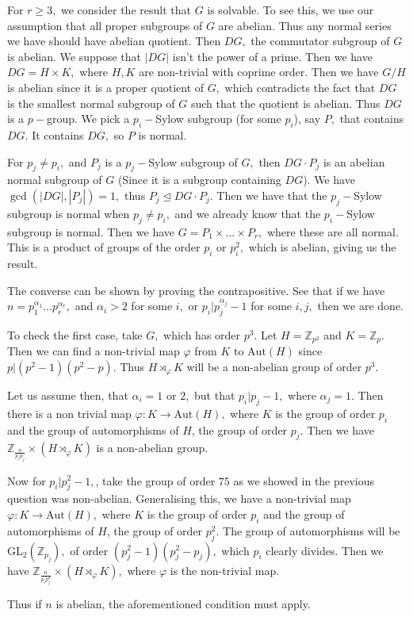 \documentclass{article}
\begin{document}
For $r \geq 3,$ we consider the result that $G$ is solvable. To see this, we use our assumption that all proper subgroups of $G$ are abelian. Thus any 
normal series we have should have abelian quotient. Then $DG,$ the commutator subgroup of $G$ is abelian. We suppose that $|DG|$ isn't the power of a prime. 
Then we have $DG=H \times K,$ where $H,K$ are non-trivial with coprime order. Then we have $G/H$ is abelian since it is a proper quotient of $G,$ which 
contradicts the fact that $DG$ is the smallest normal subgroup of $G$ such that the quotient is abelian. Thus $DG$ is a $p-$group. We pick a $p_i-$Sylow 
subgroup (for some $p_i$), say $P,$ that contains $DG.$ It contains $DG,$ so $P$ is normal. 

For $p_j \neq p_i,$ and $P_j$ is a $p_j-$Sylow subgroup of $G,$ then $DG \cdot P_j$ is an abelian normal subgroup of $G$ (Since it is a subgroup containing 
$DG$). We have $\gcd(|DG|,|P_j|)=1,$ thus $ P_j \trianglelefteq DG \cdot P_j.$ Then we have that the $p_j-$Sylow subgroup is normal when $p_j \neq p_i,$ and 
we already know that the $p_i-$Sylow subgroup is normal. Then we have $G= P_1 \times \dots \times P_r,$ where these are all normal. This is a product of 
groups of the order $p_i$ or $p_i^2,$ which is abelian, giving us the result.

The converse can be shown by proving the contrapositive. See that if we have $n=p_1^{\alpha_1}\dots p_r^{\alpha_r},$ and $\alpha_i>2$ for some $i,$ or $p_i 
| p_j^{\alpha_j}-1$ for some $i,j,$ then we are done. 

To check the first case, take $G,$ which has order $p^3.$ Let $H=\mathbb{Z}_{p^2}$ and $K=\mathbb{Z}_p.$ Then we can find a non-trivial map $\varphi$ from 
$K$ to $\text{Aut}(H)$ since $p| (p^2-1)(p^2-p).$ Thus $H \rtimes_{\varphi} K$ will be a non-abelian group of order $p^3.$ 

Let us assume then, that $\alpha_i=1$ or $2,$ but that $p_i | p_j-1,$ where $\alpha_j=1.$ Then there is a non trivial map $\varphi:K \to \text{Aut}(H),$ 
where $K$ is the group of order $p_i$ and the group of automorphisms of $H$, the group of order $p_j.$ Then we have $\mathbb{Z}_{\frac{n}{p_ip_j}} \times (H 
\rtimes_{\varphi} K)$ is a non-abelian group.  

Now for $p_i | p_j^2-1,$, take the group of order $75$ as we showed in the previous question was non-abelian. Generalising this, we have a non-trivial map 
$\varphi:K \to \text{Aut}(H),$ where $K$ is the group of order $p_i$ and the group of automorphisms of $H$, the group of order $p_j^2.$ The group of 
automorphisms will be $\text{GL}_2(\mathbb{Z}_{p_j}),$ of order $(p_j^2-1)(p_j^2-p_j),$ which $p_i$ clearly divides. Then we have 
$\mathbb{Z}_{\frac{n}{p_ip_j^2}} \times (H \rtimes_{\varphi} K),$ where $\varphi$ is the non-trivial map. 

Thus if $n$ is abelian, the aforementioned condition must apply.   
\end{document}
